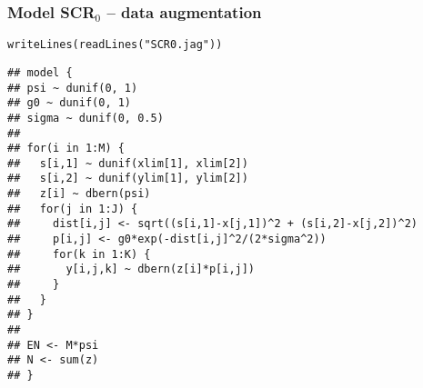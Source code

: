 \documentclass[color=usenames,dvipsnames]{beamer}\usepackage[]{graphicx}\usepackage[]{color}
\makeatletter
\newcommand{\hlstr}[1]{\textcolor[rgb]{0.749,0.012,0.012}{#1}}%
\newcommand{\hlstd}[1]{\textcolor[rgb]{0,0,0}{#1}}%
\newcommand{\hlkwd}[1]{\textcolor[rgb]{0.004,0.004,0.506}{#1}}%
\newenvironment{kframe}{%
 \def\at@end@of@kframe{}%
 \ifinner\ifhmode%
  \def\at@end@of@kframe{\end{minipage}}%
  \begin{minipage}{\columnwidth}%
 \fi\fi%
 \def\FrameCommand##1{\hskip\@totalleftmargin \hskip-\fboxsep
 \colorbox{shadecolor}{##1}\hskip-\fboxsep
     \hskip-\linewidth \hskip-\@totalleftmargin \hskip\columnwidth}%
 \MakeFramed {\advance\hsize-\width
   \@totalleftmargin\z@ \linewidth\hsize
   \@setminipage}}%
 {\par\unskip\endMakeFramed%
 \at@end@of@kframe}
\newenvironment{knitrout}{}{} %
\makeatother
\begin{document}
\begin{frame}[fragile]
  \frametitle{Model SCR$_0$ -- data augmentation}
\vspace{-3pt}
\begin{knitrout}\scriptsize
{}\color{fgcolor}\begin{kframe}
\begin{alltt}
\hlkwd{writeLines}\hlstd{(}\hlkwd{readLines}\hlstd{(}\hlstr{"SCR0.jag"}\hlstd{))}
\end{alltt}
\begin{verbatim}
## model {
## psi ~ dunif(0, 1)
## g0 ~ dunif(0, 1)
## sigma ~ dunif(0, 0.5)
## 
## for(i in 1:M) {
##   s[i,1] ~ dunif(xlim[1], xlim[2])
##   s[i,2] ~ dunif(ylim[1], ylim[2])
##   z[i] ~ dbern(psi)
##   for(j in 1:J) {
##     dist[i,j] <- sqrt((s[i,1]-x[j,1])^2 + (s[i,2]-x[j,2])^2)
##     p[i,j] <- g0*exp(-dist[i,j]^2/(2*sigma^2))
##     for(k in 1:K) {
##       y[i,j,k] ~ dbern(z[i]*p[i,j])
##     }
##   }
## }
## 
## EN <- M*psi
## N <- sum(z)
## }
\end{verbatim}
\end{kframe}
\end{knitrout}
\end{frame}
\end{document}
